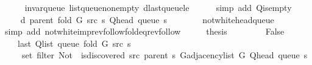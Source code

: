 \begin{isabellebody}
\ \ \ \ \isamarkupfalse%
\ invar{\isacharunderscore}{\kern0pt}queue\ list{\isacharunderscore}{\kern0pt}queue{\isacharunderscore}{\kern0pt}non{\isacharunderscore}{\kern0pt}empty\ d{\isacharunderscore}{\kern0pt}last{\isacharunderscore}{\kern0pt}queue{\isacharunderscore}{\kern0pt}le\isanewline
\ \ \ \ \isamarkupfalse%
\ {\isacharparenleft}{\kern0pt}simp\ add{\isacharcolon}{\kern0pt}\ Q{\isachardot}{\kern0pt}is{\isacharunderscore}{\kern0pt}empty{\isacharparenright}{\kern0pt}\isanewline
\ \ \isamarkupfalse%
\ \isamarkupfalse%
\ {\isachardoublequoteopen}{\isachardot}{\kern0pt}{\isachardot}{\kern0pt}{\isachardot}{\kern0pt}\ {\isacharequal}{\kern0pt}\ d\ {\isacharparenleft}{\kern0pt}parent\ {\isacharparenleft}{\kern0pt}fold\ G\ src\ s{\isacharparenright}{\kern0pt}{\isacharparenright}{\kern0pt}\ {\isacharparenleft}{\kern0pt}Q{\isacharunderscore}{\kern0pt}head\ {\isacharparenleft}{\kern0pt}queue\ s{\isacharparenright}{\kern0pt}{\isacharparenright}{\kern0pt}\ {\isacharplus}{\kern0pt}\ {}{\isachardoublequoteclose}\isanewline
\ \ \ \ \isamarkupfalse%
\ not{\isacharunderscore}{\kern0pt}white{\isacharunderscore}{\kern0pt}head{\isacharunderscore}{\kern0pt}queue\isanewline
\ \ \ \ \isamarkupfalse%
\ {\isacharparenleft}{\kern0pt}simp\ add{\isacharcolon}{\kern0pt}\ not{\isacharunderscore}{\kern0pt}white{\isacharunderscore}{\kern0pt}imp{\isacharunderscore}{\kern0pt}rev{\isacharunderscore}{\kern0pt}follow{\isacharunderscore}{\kern0pt}fold{\isacharunderscore}{\kern0pt}eq{\isacharunderscore}{\kern0pt}rev{\isacharunderscore}{\kern0pt}follow{\isacharparenright}{\kern0pt}\isanewline
\ \ \isamarkupfalse%
\ \isamarkupfalse%
\ {\isacharquery}{\kern0pt}thesis\isanewline
\ \ \ \ \isacommand{{\isachardot}{\kern0pt}}\isamarkupfalse%
\isanewline
{}\isamarkupfalse%
\isanewline
\ \ \isamarkupfalse%
\ False\isanewline
\ \ \isamarkupfalse%
\isanewline
\ \ \ \ {\isachardoublequoteopen}last\ {\isacharparenleft}{\kern0pt}Q{\isacharunderscore}{\kern0pt}list\ {\isacharparenleft}{\kern0pt}queue\ {\isacharparenleft}{\kern0pt}fold\ G\ src\ s{\isacharparenright}{\kern0pt}{\isacharparenright}{\kern0pt}{\isacharparenright}{\kern0pt}\ {\isasymin}\isanewline
\ \ \ \ \ set\ {\isacharparenleft}{\kern0pt}filter\ {\isacharparenleft}{\kern0pt}Not\ {\isasymcirc}\ is{\isacharunderscore}{\kern0pt}discovered\ src\ {\isacharparenleft}{\kern0pt}parent\ s{\isacharparenright}{\kern0pt}{\isacharparenright}{\kern0pt}\ {\isacharparenleft}{\kern0pt}G{\isachardot}{\kern0pt}adjacency{\isacharunderscore}{\kern0pt}list\ G\ {\isacharparenleft}{\kern0pt}Q{\isacharunderscore}{\kern0pt}head\ {\isacharparenleft}{\kern0pt}queue\ s{\isacharparenright}{\kern0pt}{\isacharparenright}{\kern0pt}{\isacharparenright}{\kern0pt}{\isacharparenright}{\kern0pt}{\isachardoublequoteclose}\isanewline

\end{isabellebody}
